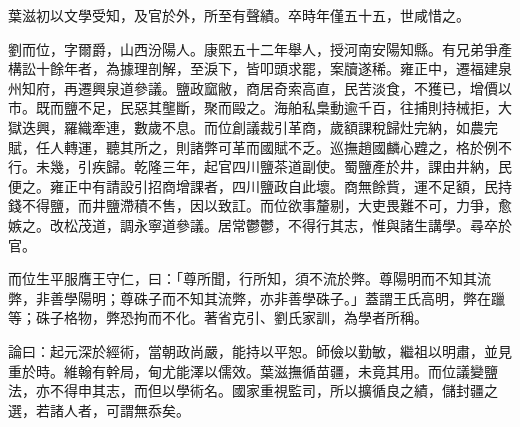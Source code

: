\begin{pinyinscope}
葉滋初以文學受知，及官於外，所至有聲績。卒時年僅五十五，世咸惜之。

劉而位，字爾爵，山西汾陽人。康熙五十二年舉人，授河南安陽知縣。有兄弟爭產構訟十餘年者，為據理剖解，至淚下，皆叩頭求罷，案牘遂稀。雍正中，遷福建泉州知府，再遷興泉道參議。鹽政窳敝，商居奇索高直，民苦淡食，不獲已，增價以市。既而鹽不足，民惡其壟斷，聚而毆之。海舶私梟動逾千百，往捕則持械拒，大獄迭興，羅織牽連，數歲不息。而位創議裁引革商，歲額課稅歸灶完納，如農完賦，任人轉運，聽其所之，則諸弊可革而國賦不乏。巡撫趙國麟心韙之，格於例不行。未幾，引疾歸。乾隆三年，起官四川鹽茶道副使。蜀鹽產於井，課由井納，民便之。雍正中有請設引招商增課者，四川鹽政自此壞。商無餘貲，運不足額，民持錢不得鹽，而井鹽滯積不售，因以致訌。而位欲事釐剔，大吏畏難不可，力爭，愈嫉之。改松茂道，調永寧道參議。居常鬱鬱，不得行其志，惟與諸生講學。尋卒於官。

而位生平服膺王守仁，曰：「尊所聞，行所知，須不流於弊。尊陽明而不知其流弊，非善學陽明；尊硃子而不知其流弊，亦非善學硃子。」蓋謂王氏高明，弊在躐等；硃子格物，弊恐拘而不化。著省克引、劉氏家訓，為學者所稱。

論曰：起元深於經術，當朝政尚嚴，能持以平恕。師儉以勤敏，繼祖以明肅，並見重於時。維翰有幹局，甸尤能澤以儒效。葉滋撫循苗疆，未竟其用。而位議變鹽法，亦不得申其志，而但以學術名。國家重視監司，所以擴循良之績，儲封疆之選，若諸人者，可謂無忝矣。


\end{pinyinscope}